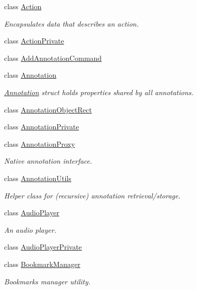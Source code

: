 \begin{DoxyCompactItemize}
\item 
class \hyperlink{classOkular_1_1Action}{Action}
\begin{DoxyCompactList}\small\item\em Encapsulates data that describes an action. \end{DoxyCompactList}\item 
class \hyperlink{classOkular_1_1ActionPrivate}{Action\+Private}
\item 
class \hyperlink{classOkular_1_1AddAnnotationCommand}{Add\+Annotation\+Command}
\item 
class \hyperlink{classOkular_1_1Annotation}{Annotation}
\begin{DoxyCompactList}\small\item\em \hyperlink{classOkular_1_1Annotation}{Annotation} struct holds properties shared by all annotations. \end{DoxyCompactList}\item 
class \hyperlink{classOkular_1_1AnnotationObjectRect}{Annotation\+Object\+Rect}
\item 
class \hyperlink{classOkular_1_1AnnotationPrivate}{Annotation\+Private}
\item 
class \hyperlink{classOkular_1_1AnnotationProxy}{Annotation\+Proxy}
\begin{DoxyCompactList}\small\item\em Native annotation interface. \end{DoxyCompactList}\item 
class \hyperlink{classOkular_1_1AnnotationUtils}{Annotation\+Utils}
\begin{DoxyCompactList}\small\item\em Helper class for (recursive) annotation retrieval/storage. \end{DoxyCompactList}\item 
class \hyperlink{classOkular_1_1AudioPlayer}{Audio\+Player}
\begin{DoxyCompactList}\small\item\em An audio player. \end{DoxyCompactList}\item 
class \hyperlink{classOkular_1_1AudioPlayerPrivate}{Audio\+Player\+Private}
\item 
class \hyperlink{classOkular_1_1BookmarkManager}{Bookmark\+Manager}
\begin{DoxyCompactList}\small\item\em Bookmarks manager utility. \end{DoxyCompactList}\item 

\end{DoxyCompactItemize}
